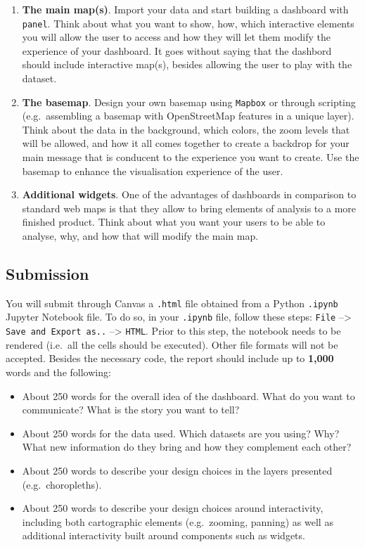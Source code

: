 \documentclass[
  letterpaper,
  DIV=11,
  numbers=noendperiod]{scrreprt}
\providecommand{\tightlist}{%
  \setlength{\itemsep}{0pt}\setlength{\parskip}{0pt}}\usepackage{longtable,booktabs,array}
\begin{document}
\begin{enumerate}
\def\labelenumi{\arabic{enumi}.}
\tightlist
\item
  \textbf{The main map(s)}. Import your data and start building a
  dashboard with \texttt{panel}. Think about what you want to show, how,
  which interactive elements you will allow the user to access and how
  they will let them modify the experience of your dashboard. It goes
  without saying that the dashbord should include interactive map(s),
  besides allowing the user to play with the dataset.
\item
  \textbf{The basemap}. Design your own basemap using \texttt{Mapbox} or
  through scripting (e.g.~assembling a basemap with OpenStreetMap
  features in a unique layer). Think about the data in the background,
  which colors, the zoom levels that will be allowed, and how it all
  comes together to create a backdrop for your main message that is
  conducent to the experience you want to create. Use the basemap to
  enhance the visualisation experience of the user.
\item
  \textbf{Additional widgets}. One of the advantages of dashboards in
  comparison to standard web maps is that they allow to bring elements
  of analysis to a more finished product. Think about what you want your
  users to be able to analyse, why, and how that will modify the main
  map.
\end{enumerate}

\hypertarget{submission-1}{%
\subsection*{Submission}\label{submission-1}}

You will submit through Canvas a \texttt{.html} file obtained from a
Python \texttt{.ipynb} Jupyter Notebook file. To do so, in your
\texttt{.ipynb} file, follow these steps: \texttt{File} --\textgreater{}
\texttt{Save\ and\ Export\ as..} --\textgreater{} \texttt{HTML}. Prior
to this step, the notebook needs to be rendered (i.e.~all the cells
should be executed). Other file formats will not be accepted. Besides
the necessary code, the report should include up to \textbf{1,000} words
and the following:

\begin{itemize}
\tightlist
\item
  About 250 words for the overall idea of the dashboard. What do you
  want to communicate? What is the story you want to tell?
\item
  About 250 words for the data used. Which datasets are you using? Why?
  What new information do they bring and how they complement each other?
\item
  About 250 words to describe your design choices in the layers
  presented (e.g.~choropleths).
\item
  About 250 words to describe your design choices around interactivity,
  including both cartographic elements (e.g.~zooming, panning) as well
  as additional interactivity built around components such as widgets.
\end{itemize}
\end{document}
